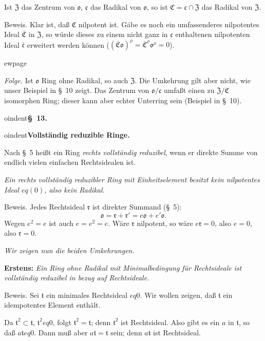 \documentclass[12pt,a4paper]{article}
\theoremstyle{definition}
\begin{document}
Ist $\mathfrak{Z}$ das Zentrum von $\mathfrak{o}$, $\mathfrak{c}$ das
Radikal von $\mathfrak{o}$, so ist $\mathfrak{C} = \mathfrak{c} \cap
\mathfrak{Z}$ das Radikal von $\mathfrak{Z}$.

Beweis. Klar ist, da\ss{} $\mathfrak{C}$ nilpotent ist. G\"abe es noch
ein umfassenderes nilpotentes Ideal $\bar{\mathfrak{C}}$ in
$\mathfrak{Z}$, so w\"urde dieses zu einem nicht ganz in $\mathfrak{c}$
enthaltenen nilpotenten Ideal $\bar{\mathfrak{c}}$ erweitert werden
k\"onnen ($(\bar{\mathfrak{C}}\mathfrak{o})^\rho =
\bar{\mathfrak{C}}^\rho \mathfrak{o}^\rho = 0$).



ewpage
\setcounter{page}{600}

\textit{Folge.} Ist $\mathfrak{o}$ Ring ohne Radikal, so auch
$\mathfrak{Z}$. Die Umkehrung gilt aber nicht, wie unser Beispiel in
\S~10 zeigt. Das Zentrum von $\mathfrak{o}/\mathfrak{c}$ umfa\ss t einen
zu $\mathfrak{Z}/\mathfrak{C}$ isomorphen Ring; dieser kann aber echter
Unterring sein (Beispiel in \S~10).



oindent\textbf{\S~13.}



oindent\textbf{Vollst\"andig reduzible Ringe.}

Nach \S~5 hei\ss t ein Ring \textit{rechts vollst\"andig reduzibel}, wenn
er direkte Summe von endlich vielen einfachen Rechtsidealen ist.

\textit{Ein rechts vollst\"andig reduzibler Ring mit Einheitselement
besitzt kein nilpotentes Ideal $ eq (0)$, also kein Radikal.}

Beweis. Jedes Rechtsideal $\mathfrak{r}$ ist direkter Summand (\S~5):
\[
\mathfrak{o} = \mathfrak{r} + \mathfrak{r}' = e\mathfrak{o} +
e'\mathfrak{o}.
\]
Wegen $e^2 = e$ ist auch $e = e^2 = e$. W\"are $\mathfrak{r}$
nilpotent, so w\"are $e\mathfrak{r} = 0$, also $e = 0$, also
$\mathfrak{r} = 0$.

\textit{Wir zeigen nun die beiden Umkehrungen.}

\textbf{Erstens:} \textit{Ein Ring ohne Radikal mit Minimalbedingung
f\"ur Rechtsideale ist vollst\"andig reduzibel in bezug auf
Rechtsideale.}

Beweis. Sei $\mathfrak{t}$ ein minimales Rechtsideal $ eq 0$. Wir
wollen zeigen, da\ss{} $\mathfrak{t}$ ein idempotentes Element enth\"alt.

Da $\mathfrak{t}^2 \subset \mathfrak{t}$, $\mathfrak{t}^2  eq 0$, folgt
$\mathfrak{t}^2 = \mathfrak{t}$; denn $\mathfrak{t}^2$ ist Rechtsideal.
Also gibt es ein $a$ in $\mathfrak{t}$, so da\ss{} $a\mathfrak{t}  eq 0$.
Dann mu\ss{} aber $a\mathfrak{t} = \mathfrak{t}$ sein; denn
$a\mathfrak{t}$ ist Rechtsideal.
\end{document}
